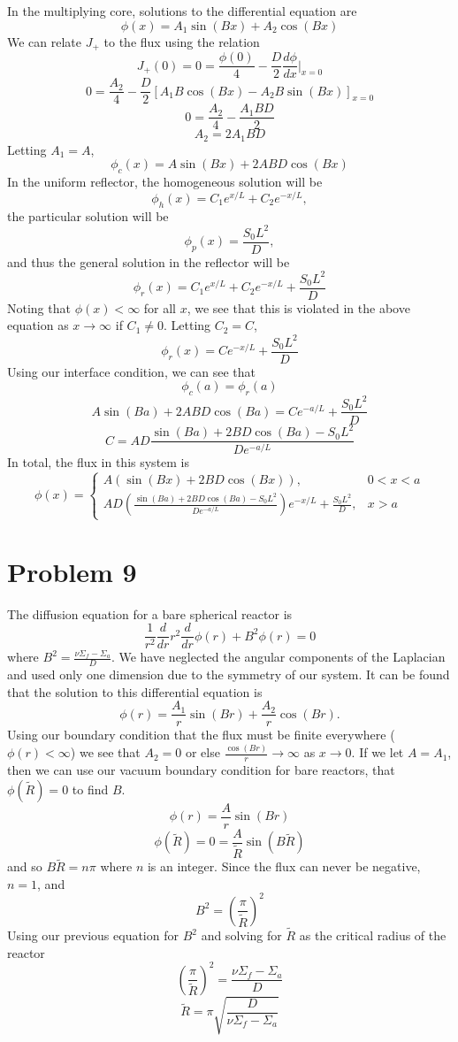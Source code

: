 \documentclass{article}
\newcommand{\Xs}{\Sigma}
\begin{document}
In the multiplying core, solutions to the differential equation are
$$ \phi(x) = A_1\sin(Bx) + A_2\cos(Bx) $$
We can relate $J_+$ to the flux using the relation
$$ J_+(0) = 0 = \frac{\phi(0)}{4} - \frac{D}{2}\frac{d\phi}{dx}\bigg|_{x=0} $$
$$ 0 = \frac{A_2}{4} - \frac{D}{2}\left[A_1 B \cos(Bx) - A_2 B \sin(Bx)\right]_{x=0} $$
$$ 0 = \frac{A_2}{4} - \frac{A_1 B D}{2} $$
$$ A_2 = 2 A_1 B D $$
Letting $A_1 = A$,
$$ \phi_c(x) = A\sin(Bx) + 2ABD\cos(Bx) $$
In the uniform reflector, the homogeneous solution will be
$$ \phi_h(x) = C_1 e^{x/L} + C_2 e^{-x/L} ,$$
the particular solution will be
$$ \phi_p(x) = \frac{S_0L^2}{D} ,$$
and thus the general solution in the reflector will be
$$ \phi_r(x) = C_1 e^{x/L} + C_2 e^{-x/L} + \frac{S_0L^2}{D} $$
Noting that $\phi(x) < \infty$ for all $x$, we see that this is violated in the above equation as $x \rightarrow \infty$ if $C_1 \neq 0$. Letting $C_2 = C$, 
$$ \phi_r(x) = C e^{-x/L} + \frac{S_0L^2}{D} $$
Using our interface condition, we can see that 
$$ \phi_c(a) = \phi_r(a) $$
$$ A\sin(Ba) + 2ABD\cos(Ba) = C e^{-a/L} + \frac{S_0L^2}{D} $$ 
$$ C = AD \frac{\sin(Ba) + 2BD\cos(Ba) - S_0L^2}{De^{-a/L}} $$
In total, the flux in this system is
$$\boxed{ \phi(x) = \begin{cases} 	A \left( \sin(Bx) + 2 BD \cos(Bx) \right), & 0<x<a \\
							AD\left( \frac{\sin(Ba) + 2BD\cos(Ba) - S_0L^2}{De^{-a/L}}\right) e^{-x/L} + \frac{S_0L^2}{D}, & x > a \end{cases} }$$




\section*{Problem 9}

The diffusion equation for a bare spherical reactor is 
$$ \frac{1}{r^2}\frac{d}{dr}r^2 \frac{d}{dr} \phi(r) + B^2 \phi(r) = 0 $$
where $B^2 = \frac{\nu\Xs_f - \Xs_a}{D}$. We have neglected the angular components of the Laplacian and used only one dimension due to the symmetry of our system.
It can be found that the solution to this differential equation is
$$ \phi(r) = \frac{A_1}{r}\sin(Br) + \frac{A_2}{r}\cos(Br) .$$
Using our boundary condition that the flux must be finite everywhere ($\phi(r) < \infty $) we see that $A_2 = 0$ or else $\frac{\cos(Br)}{r} \rightarrow \infty$ as $x \rightarrow 0$. If we let $A = A_1$, then we can use our vacuum boundary condition for bare reactors, that $\phi(\tilde{R}) = 0$ to find $B$.
$$ \phi(r) = \frac{A}{r}\sin(Br) $$
$$ \phi(\tilde{R}) = 0 = \frac{A}{\tilde{R}}\sin(B\tilde{R}) $$
and so $B\tilde{R} = n\pi$ where $n$ is an integer. Since the flux can never be negative, $n = 1$, and
$$ B^2 = \left(\frac{\pi}{\tilde{R}}\right)^2 $$
Using our previous equation for $B^2$ and solving for $\tilde{R}$ as the critical radius of the reactor
$$ \left(\frac{\pi}{\tilde{R}}\right)^2 = \frac{\nu\Xs_f - \Xs_a}{D} $$
$$ \tilde{R} = \pi\sqrt{\frac{D}{\nu\Xs_f - \Xs_a}} $$
\end{document}

